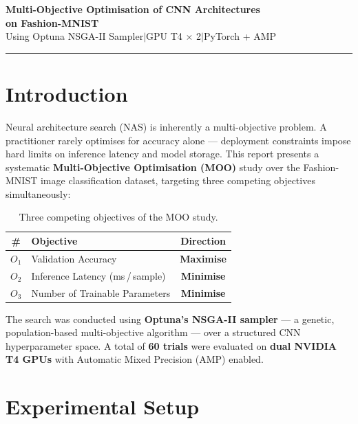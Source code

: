 \documentclass[12pt,a4paper]{article}
\begin{document}
\begin{center}
    {\LARGE\bfseries Multi-Objective Optimisation of CNN Architectures\\[4pt]
    on Fashion-MNIST}\\[10pt]
    {\large Using Optuna NSGA-II Sampler\quad$|$\quad GPU T4 $\times$ 2\quad$|$\quad PyTorch + AMP}\\[6pt]
    \rule{\linewidth}{0.8pt}
\end{center}

\section{Introduction}

Neural architecture search (NAS) is inherently a multi-objective problem. A practitioner rarely optimises for accuracy alone --- deployment constraints impose hard limits on inference latency and model storage. This report presents a systematic \textbf{Multi-Objective Optimisation (MOO)} study over the Fashion-MNIST image classification dataset, targeting three competing objectives simultaneously:

\begin{table}[H]
\centering
\begin{tabular}{clc}
\toprule
\textbf{\#} & \textbf{Objective} & \textbf{Direction} \\
\midrule
$O_1$ & Validation Accuracy & \textbf{Maximise} \\
$O_2$ & Inference Latency (ms\,/\,sample) & \textbf{Minimise} \\
$O_3$ & Number of Trainable Parameters & \textbf{Minimise} \\
\bottomrule
\end{tabular}
\caption{Three competing objectives of the MOO study.}
\end{table}

The search was conducted using \textbf{Optuna's NSGA-II sampler} --- a genetic, population-based multi-objective algorithm --- over a structured CNN hyperparameter space. A total of \textbf{60 trials} were evaluated on \textbf{dual NVIDIA T4 GPUs} with Automatic Mixed Precision (AMP) enabled.

\section{Experimental Setup}
\end{document}
